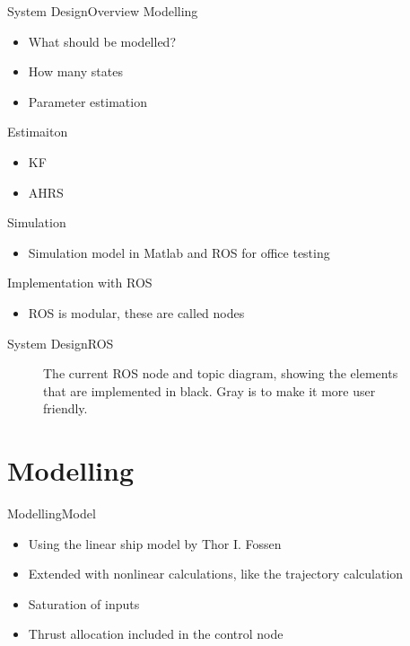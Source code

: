 \documentclass[10pt,handout]{beamer}
\begin{document}
\begin{frame}{System Design}{Overview}
Modelling
\begin{itemize}
\item What should be modelled?
\item How many states
\item Parameter estimation
\end{itemize}

Estimaiton
\begin{itemize}
\item KF
\item AHRS
\end{itemize}

Simulation
\begin{itemize}
\item Simulation model in Matlab and ROS for office testing
\end{itemize}

Implementation with ROS
\begin{itemize}
\item ROS is modular, these are called nodes
\end{itemize}
\end{frame}

\begin{frame}{System Design}{ROS}
  \begin{figure}
    {\tiny }
	  \caption{\scriptsize The current ROS node and topic diagram, showing the elements that are implemented in black. Gray is to make it more user friendly.}
  \end{figure}
\end{frame}

\section{Modelling}
\begin{frame}{Modelling}{Model}
  \begin{itemize}
    \item Using the linear ship model by Thor I. Fossen
    \item Extended with nonlinear calculations, like the trajectory calculation
    \item Saturation of inputs
    \item Thrust allocation included in the control node
  \end{itemize}
\end{frame}
\end{document}
